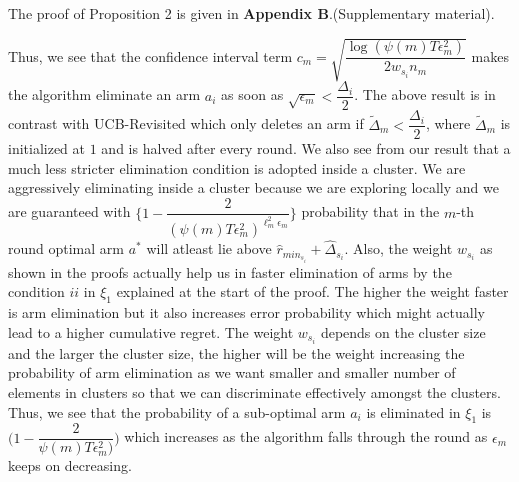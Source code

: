 	The proof of Proposition 2 is given in \textbf{Appendix B}.(Supplementary material).

\begin{remark}
	
	Thus, we see that the confidence interval term $c_{m}=\sqrt{\dfrac{\log (\psi(m)T\epsilon_{m}^{2})}{2w_{s_{i}} n_{m}}}$ makes the algorithm eliminate an arm $a_{i}$ as soon as $\sqrt{\epsilon_{m}}<\dfrac{\Delta_{i}}{2}$. The above result is in contrast with UCB-Revisited which only deletes an arm if $\tilde{\Delta}_{m}<\dfrac{\Delta_{i}}{2}$, where $\tilde{\Delta}_{m}$ is initialized at $1$ and is halved after every round. We also see from our result that a much less stricter elimination condition is adopted inside a cluster. We are aggressively eliminating inside a cluster because we are exploring locally and we are guaranteed with  $\bigg\lbrace 1- \dfrac{2}{(\psi(m)T\epsilon_{m}^{2})^{\ell_{m}^{2}\epsilon_{m}}} \bigg\rbrace$ probability that in the $m$-th round optimal arm $a^{*}$ will atleast lie above $\hat{r}_{min_{s_{i}}}+ \hat{\Delta}_{s_{i}}$. Also, the weight $w_{s_{i}}$ as shown in the proofs actually help us in faster elimination of arms by the condition $ii$ in $\xi_
{1}$ explained at the start of the proof. The higher the weight faster is arm elimination but it also increases error probability which might actually lead to a higher cumulative regret. The weight $w_{s_{i}}$ depends on the cluster size and the larger the cluster size, the higher will be the weight increasing the probability of arm elimination as we want smaller and smaller number of elements in clusters so that we can discriminate effectively amongst the clusters.
%
%
%
%
	Thus, we see that the probability of a sub-optimal arm $a_{i}$ is eliminated in $\xi_{1}$ is  $\bigg(1-\dfrac{2}{\psi(m)T\epsilon_{m}^{2})}\bigg)$ which increases as the algorithm falls through the round as $\epsilon_{m}$ keeps on decreasing.
	

\end{remark}
